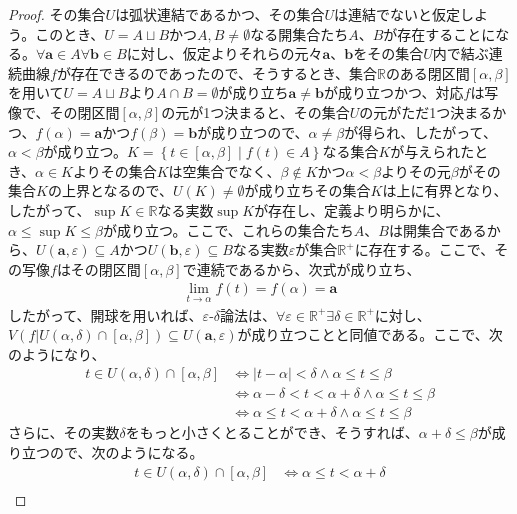 \documentclass[dvipdfmx]{jsarticle}
\begin{document}
\begin{proof}
その集合$U$は弧状連結であるかつ、その集合$U$は連結でないと仮定しよう。このとき、$U = A \sqcup B$かつ$A,B \neq \emptyset$なる開集合たち$A$、$B$が存在することになる。$\forall\mathbf{a} \in A\forall\mathbf{b} \in B$に対し、仮定よりそれらの元々$\mathbf{a}$、$\mathbf{b}$をその集合$U$内で結ぶ連続曲線$f$が存在できるのであったので、そうするとき、集合$\mathbb{R}$のある閉区間$[\alpha,\beta]$を用いて$U = A \sqcup B$より$A \cap B = \emptyset$が成り立ち$\mathbf{a} \neq \mathbf{b}$が成り立つかつ、対応$f$は写像で、その閉区間$[\alpha,\beta]$の元が1つ決まると、その集合$U$の元がただ1つ決まるかつ、$f(\alpha) = \mathbf{a}$かつ$f(\beta) = \mathbf{b}$が成り立つので、$\alpha \neq \beta$が得られ、したがって、$\alpha < \beta$が成り立つ。$K = \left\{ t \in [\alpha,\beta] \middle| f(t) \in A \right\}$なる集合$K$が与えられたとき、$\alpha \in K$よりその集合$K$は空集合でなく、$\beta \notin K$かつ$\alpha < \beta$よりその元$\beta$がその集合$K$の上界となるので、$U(K) \neq \emptyset$が成り立ちその集合$K$は上に有界となり、したがって、$\sup K \in \mathbb{R}$なる実数$\sup K$が存在し、定義より明らかに、$\alpha \leq \sup K \leq \beta$が成り立つ。ここで、これらの集合たち$A$、$B$は開集合であるから、$U\left( \mathbf{a},\varepsilon \right) \subseteq A$かつ$U\left( \mathbf{b},\varepsilon \right) \subseteq B$なる実数$\varepsilon$が集合$\mathbb{R}^{+}$に存在する。ここで、その写像$f$はその閉区間$[\alpha,\beta]$で連続であるから、次式が成り立ち、
\begin{align*}
\lim_{t \rightarrow \alpha}{f(t)} = f(\alpha) = \mathbf{a}
\end{align*}
したがって、開球を用いれば、$\varepsilon$-$\delta$論法は、$\forall\varepsilon \in \mathbb{R}^{+}\exists\delta \in \mathbb{R}^{+}$に対し、$V\left( f|U(\alpha,\delta) \cap [\alpha,\beta] \right) \subseteq U\left( \mathbf{a},\varepsilon \right)$が成り立つことと同値である。ここで、次のようになり、
\begin{align*}
t \in U(\alpha,\delta) \cap [\alpha,\beta] &\Leftrightarrow |t - \alpha| < \delta \land \alpha \leq t \leq \beta\\
&\Leftrightarrow \alpha - \delta < t < \alpha + \delta \land \alpha \leq t \leq \beta\\
&\Leftrightarrow \alpha \leq t < \alpha + \delta \land \alpha \leq t \leq \beta
\end{align*}
さらに、その実数$\delta$をもっと小さくとることができ、そうすれば、$\alpha + \delta \leq \beta$が成り立つので、次のようになる。
\begin{align*}
t \in U(\alpha,\delta) \cap [\alpha,\beta] &\Leftrightarrow \alpha \leq t < \alpha + \delta\\

\end{align*}
\end{proof}
\end{document}
